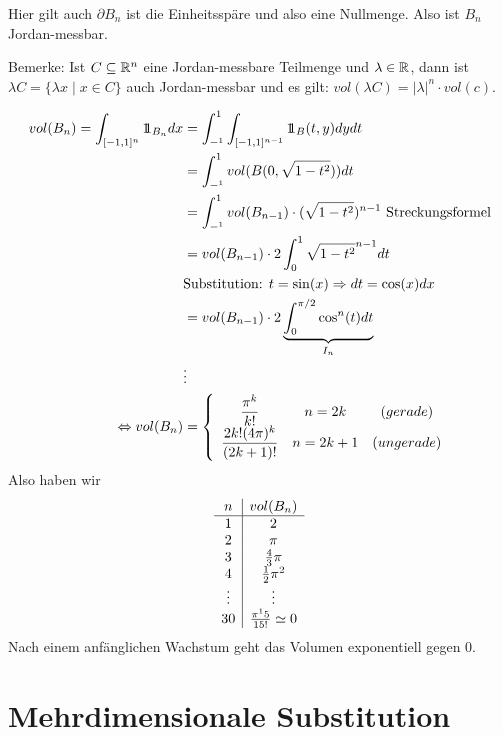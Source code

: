 \documentclass[main.tex]{subfiles}
\begin{document}
\begin{Beispiel}[$B_n = \{x \in \R^n \mid ||x||\leq 1\}$]
  Hier gilt auch $\partial B_n$ ist die Einheitsspäre und also eine Nullmenge. Also ist $B_n$ Jordan-messbar.

  Bemerke: Ist $C \subseteq \mathbb{R}^n$ eine Jordan-messbare Teilmenge und $\lambda \in \mathbb{R}$, dann ist $\lambda C = \{\lambda x \mid x \in C\}$ auch Jordan-messbar und es gilt: $vol(\lambda C) = |\lambda|^n\cdot vol(c)$.

  $$\begin{aligned}
    vol(B_n) = \int_{[-1,1]^n} 1\!\!1_{B_n} dx & = \int_{-^1}^1 \int_{[-1,1]^{n-1}} 1\!\!1_B (t,y)dy dt \\
    & = \int_{-^1}^1 vol(B(0,\sqrt{1 -t^2})) dt \\
    & = \int_{-^1}^1 vol(B_{n-1}) \cdot (\sqrt{1 -t^2})^{n-1} \text{ Streckungsformel} \\
    & = vol(B_{n-1}) \cdot 2 \int_0^1 \sqrt{1-t^2}^{n-1} dt \\
    & \text{Substitution: } t = \sin(x) \Rightarrow dt = \cos(x)dx \\
    & = vol(B_{n-1}) \cdot 2 \underbrace{\int_0^{\pi/2} \cos^n(t) dt}_{I_n} \\
    & \vdots \\
    \Leftrightarrow vol(B_n) & = \left\{\begin{array}{c c c}
      \dfrac{\pi^k}{k!} & n = 2k & (gerade) \\
      \dfrac{2k! (4\pi)^k}{(2k+1)!} & n = 2k +1 & (ungerade)
    \end{array}\right.
  \end{aligned}$$
  Also haben wir
  $$\begin{array}{c | c}
    n & vol(B_n) \\ \hline
    1 & 2 \\
    2 & \pi \\
    3 & \frac{4}{3} \pi \\
    4 & \frac{1}{2} \pi^2 \\
    \vdots & \vdots \\
    30 & \frac{\pi^15}{15!} \simeq 0
  \end{array}$$
  Nach einem anfänglichen Wachstum geht das Volumen exponentiell gegen $0$.
\end{Beispiel}


\section{Mehrdimensionale Substitution}
\end{document}
